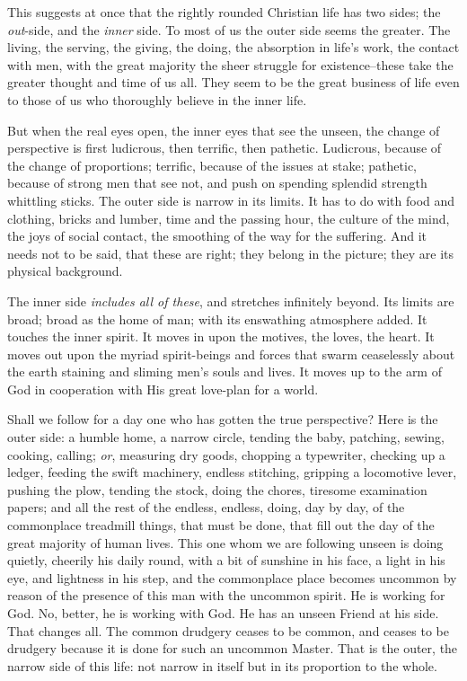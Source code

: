 This suggests at once that the rightly rounded Christian life has two
sides; the \textit{out}-side, and the \textit{inner} side. To most of us the outer side
seems the greater. The living, the serving, the giving, the doing, the
absorption in life's work, the contact with men, with the great majority
the sheer struggle for existence--these take the greater thought and time
of us all. They seem to be the great business of life even to those of us
who thoroughly believe in the inner life.

But when the real eyes open, the inner eyes that see the unseen, the
change of perspective is first ludicrous, then terrific, then pathetic.
Ludicrous, because of the change of proportions; terrific, because of the
issues at stake; pathetic, because of strong men that see not, and push on
spending splendid strength whittling sticks. The outer side is narrow in
its limits. It has to do with food and clothing, bricks and lumber, time
and the passing hour, the culture of the mind, the joys of social contact,
the smoothing of the way for the suffering. And it needs not to be said,
that these are right; they belong in the picture; they are its physical
background.

The inner side \textit{includes all of these}, and stretches infinitely beyond.
Its limits are broad; broad as the home of man; with its enswathing
atmosphere added. It touches the inner spirit. It moves in upon the
motives, the loves, the heart. It moves out upon the myriad spirit-beings
and forces that swarm ceaselessly about the earth staining and sliming
men's souls and lives. It moves up to the arm of God in cooperation with
His great love-plan for a world.

Shall we follow for a day one who has gotten the true perspective? Here is
the outer side: a humble home, a narrow circle, tending the baby,
patching, sewing, cooking, calling; \textit{or}, measuring dry goods, chopping a
typewriter, checking up a ledger, feeding the swift machinery, endless
stitching, gripping a locomotive lever, pushing the plow, tending the
stock, doing the chores, tiresome examination papers; and all the rest of
the endless, endless, doing, day by day, of the commonplace treadmill
things, that must be done, that fill out the day of the great majority of
human lives. This one whom we are following unseen is doing quietly,
cheerily his daily round, with a bit of sunshine in his face, a light in
his eye, and lightness in his step, and the commonplace place becomes
uncommon by reason of the presence of this man with the uncommon spirit.
He is working for God. No, better, he is working with God. He has an
unseen Friend at his side. That changes all. The common drudgery ceases to
be common, and ceases to be drudgery because it is done for such an
uncommon Master. That is the outer, the narrow side of this life: not
narrow in itself but in its proportion to the whole.


